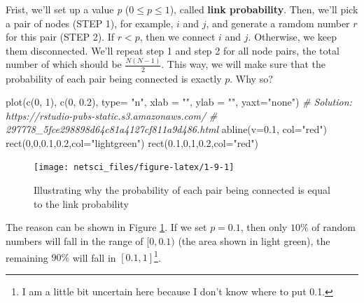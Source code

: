 \documentclass[
]{krantz}
\makeatletter
\newenvironment{Shaded}{\begin{snugshade}}{\end{snugshade}}
\newcommand{\AttributeTok}[1]{\textcolor[rgb]{0.61,0.61,0.61}{#1}}
\newcommand{\CommentTok}[1]{\textcolor[rgb]{0.37,0.37,0.37}{\textit{#1}}}
\newcommand{\DecValTok}[1]{\textcolor[rgb]{0.06,0.06,0.06}{#1}}
\newcommand{\FloatTok}[1]{\textcolor[rgb]{0.06,0.06,0.06}{#1}}
\newcommand{\FunctionTok}[1]{\textcolor[rgb]{0,0,0}{#1}}
\newcommand{\NormalTok}[1]{#1}
\newcommand{\StringTok}[1]{\textcolor[rgb]{0.5,0.5,0.5}{#1}}
\newenvironment{kframe}{%
\medskip{}
\setlength{\fboxsep}{.8em}
 \def\at@end@of@kframe{}%
 \ifinner\ifhmode%
  \def\at@end@of@kframe{\end{minipage}}%
  \begin{minipage}{\columnwidth}%
 \fi\fi%
 \def\FrameCommand##1{\hskip\@totalleftmargin \hskip-\fboxsep
 \colorbox{shadecolor}{##1}\hskip-\fboxsep
     \hskip-\linewidth \hskip-\@totalleftmargin \hskip\columnwidth}%
 \MakeFramed {\advance\hsize-\width
   \@totalleftmargin\z@ \linewidth\hsize
   \@setminipage}}%
 {\par\unskip\endMakeFramed%
 \at@end@of@kframe}
\renewenvironment{Shaded}{\begin{kframe}}{\end{kframe}}
\makeatother
\begin{document}
Frist, we'll set up a value \emph{p} (\(0 \leq p \leq 1\)), called \textbf{link probability}. Then, we'll pick a pair of nodes (STEP 1), for example, \(i\) and \(j\), and generate a ramdom number \(r\) for this pair (STEP 2). If \(r < p\), then we connect \(i\) and \(j\). Otherwise, we keep them disconnected. We'll repeat step 1 and step 2 for all node pairs, the total number of which should be \(\frac{N(N-1)}{2}\). This way, we will make sure that the probability of each pair being connected is exactly \(p\). Why so?

\begin{Shaded}
\begin{Highlighting}[]
\FunctionTok{plot}\NormalTok{(}\FunctionTok{c}\NormalTok{(}\DecValTok{0}\NormalTok{, }\DecValTok{1}\NormalTok{), }\FunctionTok{c}\NormalTok{(}\DecValTok{0}\NormalTok{, }\FloatTok{0.2}\NormalTok{), }
     \AttributeTok{type=} \StringTok{"n"}\NormalTok{, }
     \AttributeTok{xlab =} \StringTok{""}\NormalTok{, }
     \AttributeTok{ylab =} \StringTok{""}\NormalTok{, }
     \AttributeTok{yaxt=}\StringTok{"none"}\NormalTok{)}
\CommentTok{\# Solution: https://rstudio{-}pubs{-}static.s3.amazonaws.com/}
\CommentTok{\# 297778\_5fce298898d64c81a4127cf811a9d486.html}
\FunctionTok{abline}\NormalTok{(}\AttributeTok{v=}\FloatTok{0.1}\NormalTok{, }\AttributeTok{col=}\StringTok{"red"}\NormalTok{)}
\FunctionTok{rect}\NormalTok{(}\DecValTok{0}\NormalTok{,}\DecValTok{0}\NormalTok{,}\FloatTok{0.1}\NormalTok{,}\FloatTok{0.2}\NormalTok{,}\AttributeTok{col=}\StringTok{"lightgreen"}\NormalTok{)}
\FunctionTok{rect}\NormalTok{(}\FloatTok{0.1}\NormalTok{,}\DecValTok{0}\NormalTok{,}\DecValTok{1}\NormalTok{,}\FloatTok{0.2}\NormalTok{,}\AttributeTok{col=}\StringTok{"red"}\NormalTok{)}
\end{Highlighting}
\end{Shaded}

\begin{figure}

{\centering \texttt{[image: netsci\_files/figure-latex/1-9-1]} 

}

\caption{Illustrating why the probability of each pair being connected is equal to the link probability}\label{fig:1-9}
\end{figure}

The reason can be shown in Figure \ref{fig:1-9}. If we set \(p = 0.1\), then only \(10\%\) of random numbers will fall in the range of \([0,0.1)\) (the area shown in light green), the remaining \(90\%\) will fall in \([0.1,1]\)\footnote{I am a little bit uncertain here because I don't know where to put 0.1.}.
\end{document}
